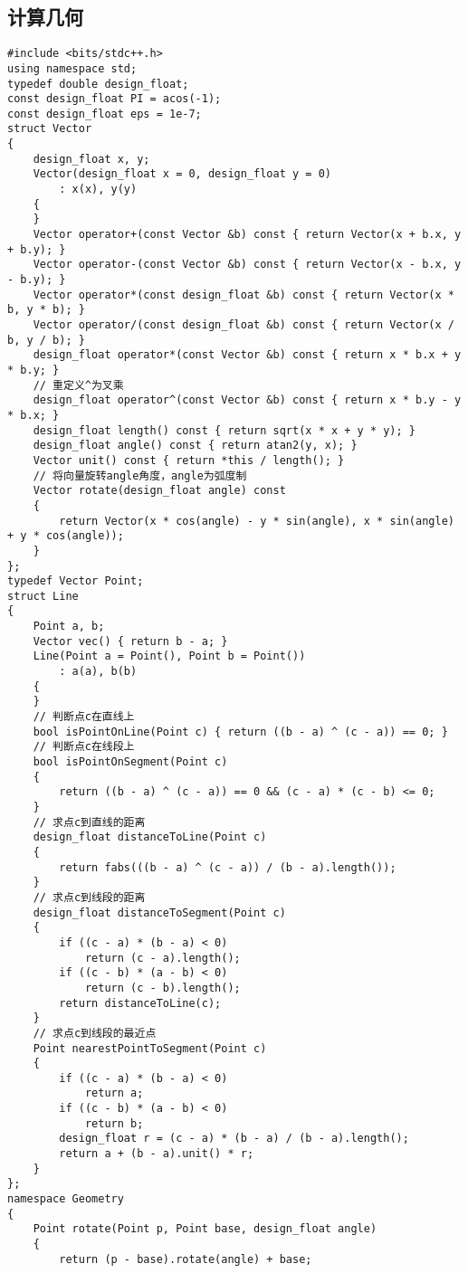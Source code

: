 \documentclass{ctexbook}  %
\begin{document}
\subsection{计算几何}
\lstset{basicstyle=	tfamily}
\begin{Verbatim}[fontsize=\small]
#include <bits/stdc++.h>
using namespace std;
typedef double design_float;
const design_float PI = acos(-1);
const design_float eps = 1e-7;
struct Vector
{
    design_float x, y;
    Vector(design_float x = 0, design_float y = 0)
        : x(x), y(y)
    {
    }
    Vector operator+(const Vector &b) const { return Vector(x + b.x, y + b.y); }
    Vector operator-(const Vector &b) const { return Vector(x - b.x, y - b.y); }
    Vector operator*(const design_float &b) const { return Vector(x * b, y * b); }
    Vector operator/(const design_float &b) const { return Vector(x / b, y / b); }
    design_float operator*(const Vector &b) const { return x * b.x + y * b.y; }
    // 重定义^为叉乘
    design_float operator^(const Vector &b) const { return x * b.y - y * b.x; }
    design_float length() const { return sqrt(x * x + y * y); }
    design_float angle() const { return atan2(y, x); }
    Vector unit() const { return *this / length(); }
    // 将向量旋转angle角度，angle为弧度制
    Vector rotate(design_float angle) const
    {
        return Vector(x * cos(angle) - y * sin(angle), x * sin(angle) + y * cos(angle));
    }
};
typedef Vector Point;
struct Line
{
    Point a, b;
    Vector vec() { return b - a; }
    Line(Point a = Point(), Point b = Point())
        : a(a), b(b)
    {
    }
    // 判断点c在直线上
    bool isPointOnLine(Point c) { return ((b - a) ^ (c - a)) == 0; }
    // 判断点c在线段上
    bool isPointOnSegment(Point c)
    {
        return ((b - a) ^ (c - a)) == 0 && (c - a) * (c - b) <= 0;
    }
    // 求点c到直线的距离
    design_float distanceToLine(Point c)
    {
        return fabs(((b - a) ^ (c - a)) / (b - a).length());
    }
    // 求点c到线段的距离
    design_float distanceToSegment(Point c)
    {
        if ((c - a) * (b - a) < 0)
            return (c - a).length();
        if ((c - b) * (a - b) < 0)
            return (c - b).length();
        return distanceToLine(c);
    }
    // 求点c到线段的最近点
    Point nearestPointToSegment(Point c)
    {
        if ((c - a) * (b - a) < 0)
            return a;
        if ((c - b) * (a - b) < 0)
            return b;
        design_float r = (c - a) * (b - a) / (b - a).length();
        return a + (b - a).unit() * r;
    }
};
namespace Geometry
{
    Point rotate(Point p, Point base, design_float angle)
    {
        return (p - base).rotate(angle) + base;

\end{Verbatim}
\end{document}
